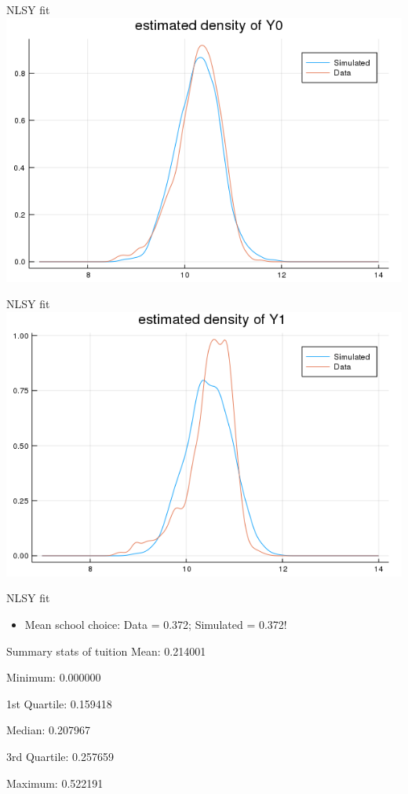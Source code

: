 \documentclass{beamer}
\begin{document}
\begin{frame}{NLSY fit}
\centering
\includegraphics[scale=0.5]{y0.png}
\end{frame}
\begin{frame}{NLSY fit}
\centering
\includegraphics[scale=0.5]{y1.png}
\end{frame}

\begin{frame}{NLSY fit}
\begin{itemize}
\item Mean school choice: Data = 0.372; Simulated = 0.372!
\end{itemize}
\end{frame}






\begin{frame}{Summary stats of tuition}
\centering
Mean:           0.214001

Minimum:        0.000000

1st Quartile:   0.159418

Median:         0.207967

3rd Quartile:   0.257659

Maximum:        0.522191
\end{frame}
\end{document}
